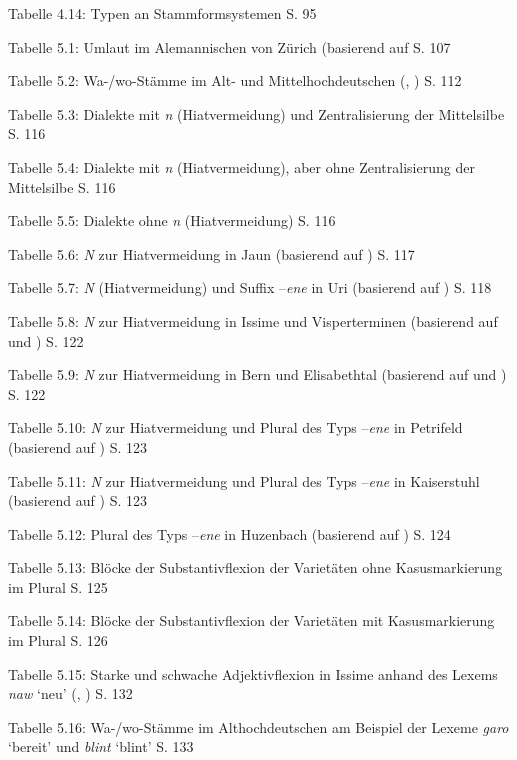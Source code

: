 Tabelle 4.14: Typen an Stammformsystemen \citep[2-4]{FinkelStump2007}   S. 95

Tabelle 5.1: Umlaut im Alemannischen von Zürich (basierend auf \citealt[111–119]{Weber1987}  S. 107

Tabelle 5.2: Wa-/wo-Stämme im Alt- und Mittelhochdeutschen (\citealt[193]{Braune2004}, \citealt[143, 189]{Paul2007})  S. 112

Tabelle 5.3: Dialekte mit \textit{n} (Hiatvermeidung) und Zentralisierung der Mittelsilbe  S. 116

Tabelle 5.4: Dialekte mit \textit{n} (Hiatvermeidung), aber ohne Zentralisierung der Mittelsilbe  S. 116

Tabelle 5.5: Dialekte ohne \textit{n} (Hiatvermeidung)  S. 116

Tabelle 5.6: \textit{N} zur Hiatvermeidung in Jaun (basierend auf \citealt[255–272]{Stucki1917})  S. 117

Tabelle 5.7: \textit{N} (Hiatvermeidung) und Suffix –\textit{ene} in Uri (basierend auf \citealt[173–185]{Clauß1929})  S. 118

Tabelle 5.8: \textit{N} zur Hiatvermeidung in Issime und Visperterminen (basierend auf \citealt[144–205]{Zürrer1999} und \citealt[119–134]{Wipf1911})  S. 122

Tabelle 5.9: \textit{N} zur Hiatvermeidung in Bern und Elisabethtal (basierend auf \citealt[82–90]{Marti1985} und \citealt[50–52]{Žirmunskij1928/29})  S. 122

Tabelle 5.10: \textit{N} zur Hiatvermeidung und Plural des Typs –\textit{ene} in Petrifeld (basierend auf \citealt[59–62]{Moser1937})  S. 123

Tabelle 5.11: \textit{N} zur Hiatvermeidung und Plural des Typs –\textit{ene} in Kaiserstuhl (basierend auf \citealt[359–373]{Noth1993})  S. 123

Tabelle 5.12: Plural des Typs –\textit{ene} in Huzenbach (basierend auf \citealt[92–98]{Baur1967})  S. 124

Tabelle 5.13: Blöcke der Substantivflexion der Varietäten ohne Kasusmarkierung im Plural  S. 125

Tabelle 5.14: Blöcke der Substantivflexion der Varietäten mit Kasusmarkierung im Plural  S. 126

Tabelle 5.15: Starke und schwache Adjektivflexion in Issime anhand des Lexems \textit{naw} ‘neu’ (\citealt[90–97]{Perinetto1981}, \citealt[267–268]{Zürrer1999})  S. 132

Tabelle 5.16: Wa-/wo-Stämme im Althochdeutschen am Beispiel der Lexeme \textit{garo} ‘bereit’ und \textit{blint} ‘blint’ \citep[220, 225]{Braune2004}  S. 133

